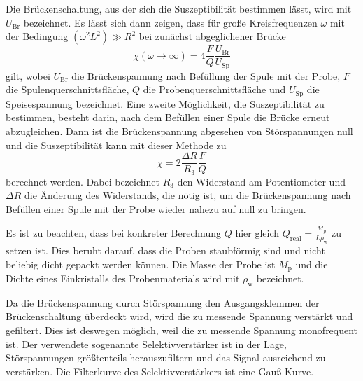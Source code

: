 Die Brückenschaltung, aus der sich die Suszeptibilität bestimmen lässt, wird mit $U_\text{Br}$ bezeichnet.
Es lässt sich dann zeigen, dass für große Kreisfrequenzen $\omega$ mit der Bedingung
$(\omega^2 L ^2) \gg R^2$ bei zunächst abgeglichener Brücke
\begin{equation}
  \chi(\omega \to \infty) = 4 \frac{F}{Q} \frac{U_\text{Br}}{U_\text{Sp}}
  \label{eqn:spannung}
\end{equation}
gilt, wobei $U_\text{Br}$ die Brückenspannung nach Befüllung der Spule mit der Probe,
$F$ die Spulenquerschnittsfläche, $Q$ die Probenquerschnittsfläche und $U_\text{Sp}$ die Speisespannung bezeichnet.
Eine zweite Möglichkeit, die Suszeptibilität zu bestimmen, besteht darin, nach dem Befüllen
einer Spule die Brücke erneut abzugleichen. Dann ist die Brückenspannung abgesehen von Störspannungen
null und die Suszeptibilität kann mit dieser Methode zu
\begin{equation}
  \chi = 2 \frac{\Delta R}{R_3} \frac{F}{Q}
  \label{eqn:widerstand}
\end{equation}
berechnet werden. Dabei bezeichnet $R_3$ den Widerstand am Potentiometer und $\Delta R$
die Änderung des Widerstands, die nötig ist, um die Brückenspannung nach Befüllen
einer Spule mit der Probe wieder nahezu auf null zu bringen.

Es ist zu beachten, dass bei konkreter Berechnung $Q$ hier gleich $Q_\text{real} =  \frac{M_\text{p}}{L \rho_\text{w}}$
zu setzen ist. Dies beruht darauf, dass die Proben staubförmig sind und nicht beliebig
dicht gepackt werden können. Die Masse der Probe ist $M_\text{p}$ und die Dichte eines Einkristalls
des Probenmaterials wird mit $\rho_\text{w}$ bezeichnet.

Da die Brückenspannung durch Störspannung den Ausgangsklemmen der Brückenschaltung
überdeckt wird, wird die zu messende Spannung verstärkt und gefiltert. Dies ist deswegen möglich, weil
die zu messende Spannung monofrequent ist. Der verwendete sogenannte Selektivverstärker
ist in der Lage, Störspannungen größtenteils herauszufiltern und das Signal ausreichend zu verstärken.
Die Filterkurve des Selektivverstärkers ist eine Gauß-Kurve.
